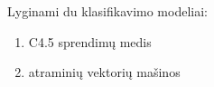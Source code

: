 
Lyginami du klasifikavimo modeliai:
\begin{enumerate}
\item C4.5 sprendimų medis
\item atraminių vektorių mašinos
\end{enumerate}


